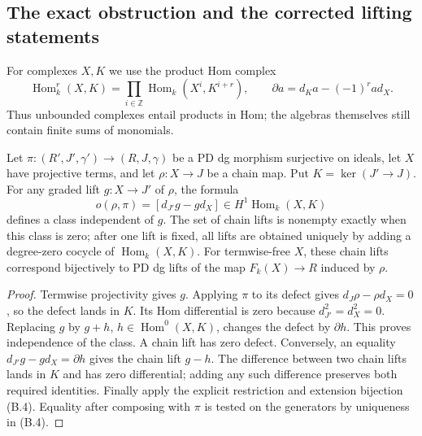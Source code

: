 \subsection{The exact obstruction and the corrected lifting statements}

For complexes $X,K$ we use the product Hom complex
\[
\operatorname{Hom}^r_k(X,K)
=\prod_{i\in\mathbb Z}\operatorname{Hom}_k(X^i,K^{i+r}),\qquad
\partial a=d_Ka-(-1)^r a d_X.                                   \tag{B.6}
\]
Thus unbounded complexes entail products in Hom; the algebras themselves
still contain finite sums of monomials.

\begin{theorem}
\label{B003}
Let $\pi:(R',J',\gamma')\to(R,J,\gamma)$ be a PD dg morphism
surjective on ideals, let $X$ have projective terms, and let
$\rho:X\to J$ be a chain map.  Put $K=\ker(J'\to J)$.
For any graded lift $g:X\to J'$ of $\rho$, the formula
\[
o(\rho,\pi)=[d_{J'}g-gd_X]\in H^1\operatorname{Hom}_k(X,K)       \tag{B.7}
\]
defines a class independent of $g$.
The set of chain lifts is nonempty exactly when this class is zero;
after one lift is fixed, all lifts are obtained uniquely by adding a
degree-zero cocycle of $\operatorname{Hom}_k(X,K)$.
For termwise-free $X$, these chain lifts correspond bijectively to PD dg
lifts of the map $F_k(X)\to R$ induced by $\rho$.
\end{theorem}

\begin{proof}
Termwise projectivity gives $g$.  Applying $\pi$ to its defect gives
$d_J\rho-\rho d_X=0$, so the defect lands in $K$.
Its Hom differential is zero because $d_{J'}^2=d_X^2=0$.
Replacing $g$ by $g+h$, $h\in\operatorname{Hom}^0(X,K)$, changes the
defect by $\partial h$.  This proves independence of the class.
A chain lift has zero defect.  Conversely, an equality
$d_{J'}g-gd_X=\partial h$ gives the chain lift $g-h$.
The difference between two chain lifts lands in $K$ and has zero
differential; adding any such difference preserves both required
identities.  Finally apply the explicit restriction and extension
bijection \textup{(B.4)}.  Equality after composing with $\pi$ is tested
on the generators by uniqueness in \textup{(B.4)}.
\end{proof}

